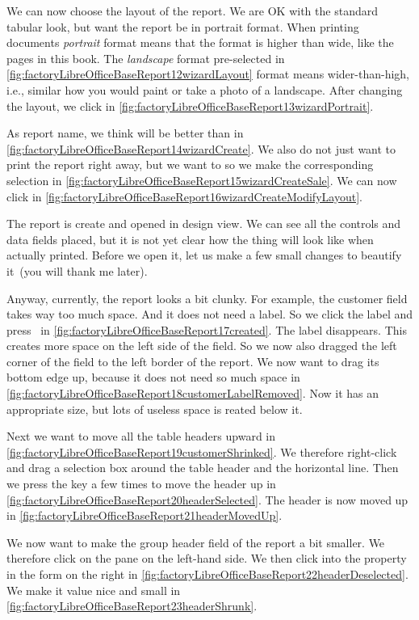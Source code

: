 We can now choose the layout of the report.
We are OK with the standard tabular look, but want the report be in portrait format.
When printing documents \emph{portrait} format means that the format is higher than wide, like the pages in this book.
The \emph{landscape} format pre-selected in \cref{fig:factoryLibreOfficeBaseReport12wizardLayout} format means wider-than-high, i.e., similar how you would paint or take a photo of a landscape.
After changing the layout, we click  in \cref{fig:factoryLibreOfficeBaseReport13wizardPortrait}.

As report name, we think  will be better than  in \cref{fig:factoryLibreOfficeBaseReport14wizardCreate}.
We also do not just want to print the report right away, but we want to  so we make the corresponding selection in \cref{fig:factoryLibreOfficeBaseReport15wizardCreateSale}.
We can now click  in \cref{fig:factoryLibreOfficeBaseReport16wizardCreateModifyLayout}.

The report is create and opened in design view.
We can see all the controls and data fields placed, but it is not yet clear how the thing will look like when actually printed.
Before we open it, let us make a few small changes to beautify it~(you will thank me later).

Anyway, currently, the report looks a bit clunky.
For example, the customer field takes way too much space.
And it does not need a label.
So we click the label and press~\keys{\del} in \cref{fig:factoryLibreOfficeBaseReport17created}.
The label disappears.
This creates more space on the left side of the  field.
So we now also dragged the left corner of the  field to the left border of the report.
We now want to drag its bottom edge up, because it does not need so much space in \cref{fig:factoryLibreOfficeBaseReport18customerLabelRemoved}.
Now it has an appropriate size, but lots of useless space is reated below it.

Next we want to move all the table headers upward in \cref{fig:factoryLibreOfficeBaseReport19customerShrinked}.
We therefore right-click and drag a selection box around the table header and the horizontal line.
Then we press the \keys{\arrowkeyup} key a few times to move the header up in \cref{fig:factoryLibreOfficeBaseReport20headerSelected}.
The header is now moved up in \cref{fig:factoryLibreOfficeBaseReport21headerMovedUp}.

We now want to make the group header field of the report a bit smaller.
We therefore click on the  pane on the left-hand side.
We then click into the  property in the form on the right in \cref{fig:factoryLibreOfficeBaseReport22headerDeselected}.
We make it value nice and small in \cref{fig:factoryLibreOfficeBaseReport23headerShrunk}.

